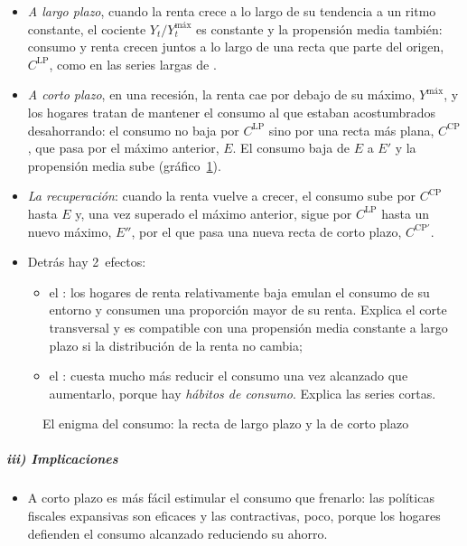 \documentclass[11pt]{article}
\begin{document}
\begin{itemize}
\item \emph{A largo plazo}, cuando la renta crece a lo largo de su tendencia a un ritmo constante, el cociente $Y_t/Y^{\text{máx}}_t$ es constante y la propensión media también: consumo y renta crecen juntos a lo largo de una recta que parte del origen, $C^{\mathrm{LP}}$, como en las series largas de .
\item \emph{A corto plazo}, en una recesión, la renta cae por debajo de su máximo, $Y^{\text{máx}}$, y los hogares tratan de mantener el consumo al que estaban acostumbrados desahorrando: el consumo no baja por $C^{\mathrm{LP}}$ sino por una recta más plana, $C^{\mathrm{CP}}$, que pasa por el máximo anterior, $E$. El consumo baja de $E$ a $E'$ y la propensión media sube (gráfico~\ref{fig:consumo-renta}).
\item \emph{La recuperación}: cuando la renta vuelve a crecer, el consumo sube por $C^{\mathrm{CP}}$ hasta $E$ y, una vez superado el máximo anterior, sigue por $C^{\mathrm{LP}}$ hasta un nuevo máximo, $E''$, por el que pasa una nueva recta de corto plazo, $C^{\mathrm{CP}\prime}$.
\item Detrás hay 2~efectos:
  \begin{itemize}
  \item el : los hogares de renta relativamente baja emulan el consumo de su entorno y consumen una proporción mayor de su renta. Explica el corte transversal y es compatible con una propensión media constante a largo plazo si la distribución de la renta no cambia;
  \item el : cuesta mucho más reducir el consumo una vez alcanzado que aumentarlo, porque hay \emph{hábitos de consumo}. Explica las series cortas.
  \end{itemize}
\end{itemize}

\begin{figure}[H]
\centering
\caption{El enigma del consumo: la recta de largo plazo y la de corto plazo}\label{fig:consumo-renta}
\end{figure}

\subparagraph{iii) Implicaciones}

\begin{itemize}
\item A corto plazo es más fácil estimular el consumo que frenarlo: las políticas fiscales expansivas son eficaces y las contractivas, poco, porque los hogares defienden el consumo alcanzado reduciendo su ahorro.
\end{itemize}
\end{document}
